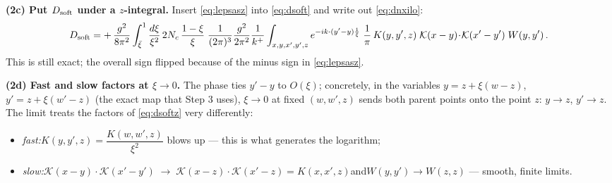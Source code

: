 \documentclass[10pt]{article}
\newcommand{\KK}{\mathcal K(x-y)\!\cdot\!\mathcal K(x'-y')}
\begin{document}
\textbf{(2c) Put $D_{\rm soft}$ under a $z$-integral.} Insert \eqref{eq:lepsasz} into
\eqref{eq:dsoft} and write out \eqref{eq:dnxilo}:
\begin{align}\label{eq:dsoftz}
D_{\rm soft}
=+\,\frac{g^{2}}{8\pi^{2}}\int_{\bar\xi}^{1}\frac{d\xi}{\xi^{2}}\,2N_{c}\,\frac{1-\xi}{\xi}\;
\frac{1}{(2\pi)^{3}}\frac{g^{2}}{2\pi^{2}}\frac{1}{k^{+}}
\int_{x,y,x',y',z} e^{-ik\cdot(y'-y)\frac{1}{\xi}}\;\frac{1}{\pi}\,K(y,y',z)\;\KK\;W(y,y')\,.
\end{align}
This is still exact; the overall sign flipped because of the minus sign in \eqref{eq:lepsasz}.

\textbf{(2d) Fast and slow factors at $\xi\to0$.} The phase ties $y'-y$ to $O(\xi)$; concretely,
in the variables $y=z+\xi(w-z)$, $y'=z+\xi(w'-z)$ (the exact map that Step 3 uses), $\xi\to0$
at fixed $(w,w',z)$ sends both parent points onto the point $z$: $y\to z$, $y'\to z$. The limit
treats the factors of \eqref{eq:dsoftz} very differently:
\begin{itemize}
\item[] \emph{fast:}\quad $K(y,y',z)=\dfrac{K(w,w',z)}{\xi^{2}}$ blows up --- this is what generates the logarithm;
\item[] \emph{slow:}\quad $\KK\;\to\;\mathcal K(x-z)\!\cdot\!\mathcal K(x'-z)=K(x,x',z)$\quad and\quad $W(y,y')\to W(z,z)$ --- smooth, finite limits.
\end{itemize}
\end{document}
